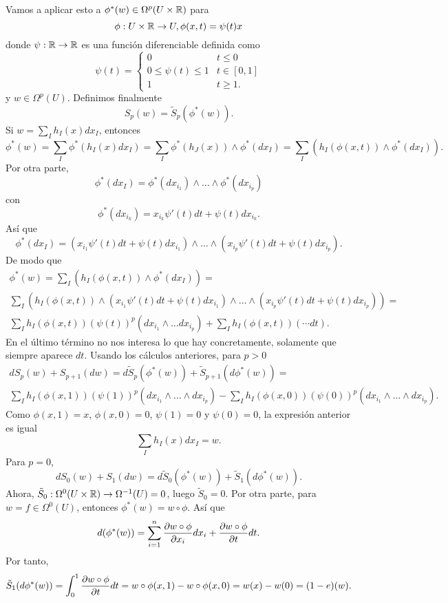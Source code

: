 \documentclass[CV.tex]{subfiles}
\begin{document}
\begin{dem}
Vamos a aplicar esto a $\phi^*(w)\in\Omega^p(U\times\mathbb{R})$ para 
\[
\phi:U\times\mathbb{R}\to U, \phi(x,t)=\psi(t)x
\]
donde $\psi:\mathbb{R}\to\mathbb{R}$ es una función diferenciable definida como
\[
\psi(t)=\begin{cases}
0 & t\leq 0\\
0\leq\psi(t)\leq 1 & t\in[0,1]\\
1 & t\geq 1.
\end{cases}
\]
y $w\in\Omega^p(U)$. Definimos finalmente 
\[
S_p(w)=\tilde{S}_p(\phi^*(w)).
\]
Si $w=\sum_Ih_I(x)dx_I$, entonces 
\[
\phi^*(w)=\sum_I\phi^*(h_I(x)dx_I)=\sum_I\phi^*(h_J(x))\land \phi^*(dx_I)=\sum_I(h_I(\phi(x,t))\land\phi^*(dx_I)).
\]
Por otra parte, 
\[
\phi^*(dx_I)=\phi^*(dx_{i_1})\land\dots\land\phi^*(dx_{i_p})
\]
con 
\[
\phi^*(dx_{i_k})=x_{i_k}\psi'(t)dt+\psi(t)dx_{i_k}.
\]
Así que
\[
\phi^*(dx_I)=(x_{i_1}\psi'(t)dt+\psi(t)dx_{i_1})\land\dots\land(x_{i_p}\psi'(t)dt+\psi(t)dx_{i_p}).
\]
De modo que
\begin{gather*}
\phi^*(w)=\sum_I(h_I(\phi(x,t))\land\phi^*(dx_I))=\\
\sum_I(h_I(\phi(x,t))\land (x_{i_1}\psi'(t)dt+\psi(t)dx_{i_1})\land\dots\land(x_{i_p}\psi'(t)dt+\psi(t)dx_{i_p}))=\\
\sum_Ih_I(\phi(x,t))(\psi(t))^p(dx_{i_1}\land\dots dx_{i_p})+\sum_Ih_I(\phi(x,t))(\cdots dt).
\end{gather*}
En el último término no nos interesa lo que hay concretamente, solamente que siempre aparece $dt$. Usando los cálculos anteriores, para $p>0$
\begin{gather*}
dS_p(w)+S_{p+1}(dw)=d\tilde{S}_p(\phi^*(w))+\tilde{S}_{p+1}(d\phi^*(w))=\\
\sum_Ih_I(\phi(x,1))(\psi(1))^p(dx_{i_1}\land\dots\land dx_{i_p})-\sum_Ih_I(\phi(x,0))(\psi(0))^p(dx_{i_1}\land\dots\land dx_{i_p}).
\end{gather*}
Como $\phi(x,1)=x$, $\phi(x,0)=0$, $\psi(1)=0$ y $\psi(0)=0$, la expresión anterior es igual
\[
\sum_Ih_I(x)dx_I=w.
\]
Para $p=0$, 
\[
dS_0(w)+S_1(dw)=d\tilde{S}_0(\phi^*(w))+\tilde{S}_1(d\phi^*(w)).
\]
Ahora, $\tilde{S}_0:\Omega^0(U\times\mathbb{R})\to\Omega^{-1}(U)=0$, luego $\tilde{S}_0=0$. Por otra parte, para $w=f\in\Omega^0(U)$, entonces $\phi^*(w)=w\circ\phi$. Así que
\[
d(\phi^*(w))=\sum_{i=1}^n\frac{\partial w\circ\phi}{\partial x_i}dx_i+\frac{\partial w\circ\phi}{\partial t}dt.
\]
Por tanto,
\[
\tilde{S}_1(d\phi^*(w))=\int_0^1\frac{\partial w\circ\phi}{\partial t}dt=w\circ\phi(x,1)-w\circ\phi(x,0)=w(x)-w(0)=(1-e)(w).
\]
\QED
\end{dem}
\end{document}
